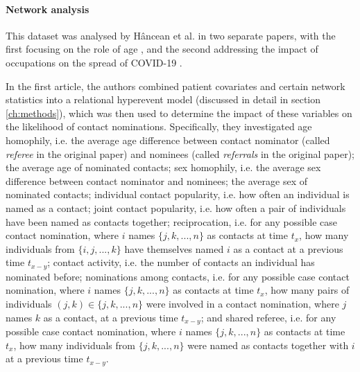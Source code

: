 \paragraph{Network analysis} This dataset was analysed by H\^ancean et al. in two separate papers, with the first focusing on the role of age \cite{hancean2021role}, and the second addressing the impact of occupations on the spread of COVID-19 \cite{hancean2022occupations}.

\bigskip

In the first article, the authors combined patient covariates and certain network statistics into a relational hyperevent model (discussed in detail in section \ref{ch:methods}), which was then used to determine the impact of these variables on the likelihood of contact nominations. Specifically, they investigated age homophily, i.e. the average age difference between contact nominator (called \emph{referee} in the original paper) and nominees (called \emph{referrals} in the original paper); the average age of nominated contacts; sex homophily, i.e. the average sex difference between contact nominator and nominees; the average sex of nominated contacts; individual contact popularity, i.e. how often an individual is named as a contact; joint contact popularity, i.e. how often a pair of individuals have been named as contacts together; reciprocation, i.e. for any possible case contact nomination, where $i$ names $\{j,k,...,n\}$ as contacts at time $t_x$, how many individuals from $\{i,j,...,k\}$ have themselves named $i$ as a contact at a previous time $t_{x-y}$; contact activity, i.e. the number of contacts an individual has nominated before; nominations among contacts, i.e. for any possible case contact nomination, where $i$ names $\{j,k,...,n\}$ as contacts at time $t_x$, how many pairs of individuals $(j,k) \in \{j,k,...,n\}$ were involved in a contact nomination, where $j$ names $k$ as a contact, at a previous time $t_{x-y}$; and shared referee, i.e. for any possible case contact nomination, where $i$ names $\{j,k,...,n\}$ as contacts at time $t_x$, how many individuals from $\{j,k,...,n\}$ were named as contacts together with $i$ at a previous time $t_{x-y}$.

